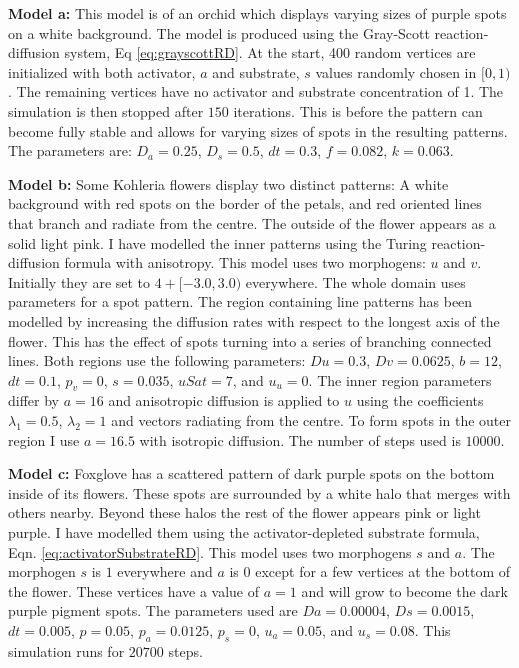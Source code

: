 \textbf{Model a:} 
This model is of an orchid which displays varying sizes of purple spots on a white background. The model is produced using the Gray-Scott reaction-diffusion system, Eq \ref{eq:grayscottRD}. At the start, 400 random vertices are initialized with both activator, $a$ and substrate, $s$ values randomly chosen in $[0, 1)$. The remaining vertices have no activator and substrate concentration of 1. The simulation is then stopped after $150$ iterations. This is before the pattern can become fully stable and allows for varying sizes of spots in the resulting patterns. The parameters are: $D_a = 0.25$, $D_s = 0.5$, $dt = 0.3$, $f = 0.082$, $k = 0.063$.

\textbf{Model b:}
Some Kohleria flowers display two distinct patterns: A white background with red spots on the border of the petals, and red oriented lines that branch and radiate from the centre. The outside of the flower appears as a solid light pink. I have modelled the inner patterns using the Turing reaction-diffusion formula with anisotropy. This model uses two morphogens: $u$ and $v$. Initially they are set to $4 + [-3.0, 3.0)$ everywhere. The whole domain uses parameters for a spot pattern. The region containing line patterns has been modelled by increasing the diffusion rates with respect to the longest axis of the flower. This has the effect of spots turning into a series of branching connected lines. Both regions use the following parameters: $Du=0.3$, $Dv=0.0625$, $b=12$, $dt=0.1$, $p_v=0$, $s=0.035$, $uSat=7$, and $u_u=0$. The inner region parameters differ by $a=16$ and anisotropic diffusion is applied to $u$ using the coefficients $\lambda_{1}=0.5$, $\lambda_{2}=1$ and vectors radiating from the centre. To form spots in the outer region I use $a=16.5$ with isotropic diffusion. The number of steps used is $10000$.

\textbf{Model c:}
Foxglove has a scattered pattern of dark purple spots on the bottom inside of its flowers. These spots are surrounded by a white halo that merges with others nearby. Beyond these halos the rest of the flower appears pink or light purple. I have modelled them using the activator-depleted substrate formula, Eqn. \ref{eq:activatorSubstrateRD}. This model uses two morphogens $s$ and $a$. The morphogen $s$ is $1$ everywhere and $a$ is $0$ except for a few vertices at the bottom of the flower. These vertices have a value of $a=1$ and will grow to become the dark purple pigment spots. The parameters used are $Da=0.00004$, $Ds=0.0015$, $dt=0.005$, $p=0.05$, $p_a=0.0125$, $p_s=0$, $u_a=0.05$, and $u_s=0.08$. This simulation runs for $20700$ steps.

